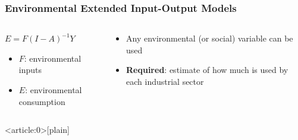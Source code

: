 \documentclass[aspectratio=169]{beamer}
\begin{document}
\begin{frame}
  \frametitle{Environmental Extended Input-Output Models}
\begin{columns}
\begin{column}{0.5\textwidth}
\begin{center}
$E = F(I - A)^{-1}Y$
\\
\begin{itemize}
\item $F$: environmental inputs 
\item $E$: environmental consumption
\end{itemize}
\end{center}
\end{column}
\begin{column}{0.5\textwidth}  %
  \begin{itemize}
  \item Any environmental (or social) variable can be used \pause
  \item \textbf{Required}: estimate of how much is used by each
  industrial sector
  \end{itemize}
\end{column}
\end{columns}
\end{frame}

{ 
\begin{frame}<article:0>[plain]
   \frametitle{}
\end{frame}
}
\end{document}
